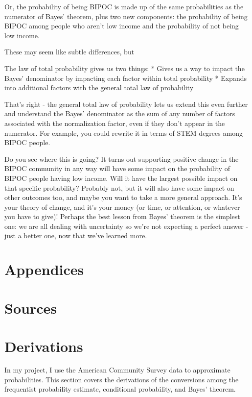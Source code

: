 \documentclass[12pt]{article}
\begin{document}
Or, the probability of being BIPOC is made up of the same probabilities as the numerator of Bayes' theorem, plus two new components: the probability of being BIPOC among people who aren't low income and the probability of not being low income.

These may seem like subtle differences, but 

The law of total probability gives us two things:
* Gives us a way to impact the Bayes' denominator by impacting each factor within total probability
* Expands into additional factors with the general total law of probability

That's right - the general total law of probability lets us extend this even further and understand the Bayes' denominator as the sum of any number of factors associated with the normalization factor, even if they don't appear in the numerator. For example, you could rewrite it in terms of STEM degrees among BIPOC people.

Do you see where this is going? It turns out supporting positive change in the BIPOC community in any way will have some impact on the probability of BIPOC people having low income. Will it have the largest possible impact on that specific probability? Probably not, but it will also have some impact on other outcomes too, and maybe you want to take a more general approach. It's your theory of change, and it's your money (or time, or attention, or whatever you have to give)! Perhaps the best lesson from Bayes' theorem is the simplest one: we are all dealing with uncertainty so we're not expecting a perfect answer - just a better one, now that we've learned more.

\newpage 

\appendix
{}
\section*{Appendices}
\section{Sources}


\printbibliography[heading=none]


\section{Derivations}

In my project, I use the American Community Survey data to approximate probabilities. This section covers the derivations of the conversions among the frequentist probability estimate, conditional probability, and Bayes' theorem.
\end{document}
